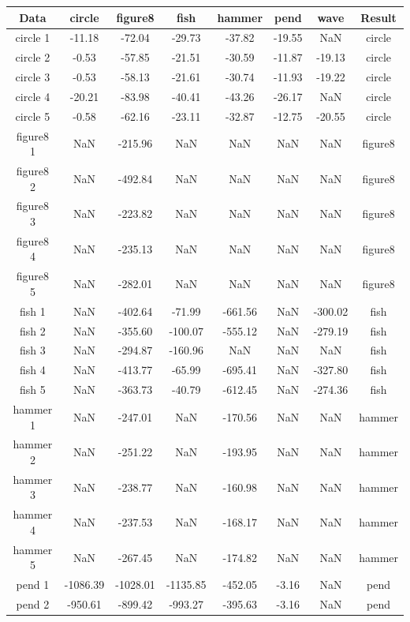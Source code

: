 \documentclass[twoside]{article}
\begin{document}
\begin{table}[H]
\centering
\begin{tabular}{|c|c|c|c|c|c|c|c|}\hline
Data & circle & figure8 & fish & hammer & pend & wave & Result \\ \hline\hline
circle 1 & -11.18 & -72.04 & -29.73 & -37.82 & -19.55 & NaN    & circle \\
circle 2 & -0.53  & -57.85 & -21.51 & -30.59 & -11.87 & -19.13 & circle \\
circle 3 & -0.53  & -58.13 & -21.61 & -30.74 & -11.93 & -19.22 & circle \\
circle 4 & -20.21 & -83.98 & -40.41 & -43.26 & -26.17 & NaN    & circle \\
circle 5 & -0.58  & -62.16 & -23.11 & -32.87 & -12.75 & -20.55 & circle \\ \hline \hline
figure8 1 & NaN & -215.96 & NaN & NaN & NaN & NaN & figure8 \\
figure8 2 & NaN & -492.84 & NaN & NaN & NaN & NaN & figure8 \\
figure8 3 & NaN & -223.82 & NaN & NaN & NaN & NaN & figure8 \\
figure8 4 & NaN & -235.13 & NaN & NaN & NaN & NaN & figure8 \\
figure8 5 & NaN & -282.01 & NaN & NaN & NaN & NaN & figure8 \\ \hline\hline
fish 1 & NaN & -402.64 &  -71.99 & -661.56 & NaN & -300.02 & fish \\
fish 2 & NaN & -355.60 & -100.07 & -555.12 & NaN & -279.19 & fish \\
fish 3 & NaN & -294.87 & -160.96 &     NaN & NaN &     NaN & fish \\
fish 4 & NaN & -413.77 &  -65.99 & -695.41 & NaN & -327.80 & fish \\
fish 5 & NaN & -363.73 &  -40.79 & -612.45 & NaN & -274.36 & fish \\ \hline\hline
hammer 1 & NaN & -247.01 & NaN & -170.56 & NaN & NaN & hammer\\
hammer 2 & NaN & -251.22 & NaN & -193.95 & NaN & NaN & hammer\\
hammer 3 & NaN & -238.77 & NaN & -160.98 & NaN & NaN & hammer\\
hammer 4 & NaN & -237.53 & NaN & -168.17 & NaN & NaN & hammer\\
hammer 5 & NaN & -267.45 & NaN & -174.82 & NaN & NaN & hammer\\ \hline\hline
pend 1 & -1086.39 & -1028.01 & -1135.85 & -452.05 & -3.16 & NaN & pend\\
pend 2 &  -950.61 &  -899.42 &  -993.27 & -395.63 & -3.16 & NaN & pend\\

\end{tabular}
\end{table}
\end{document}
